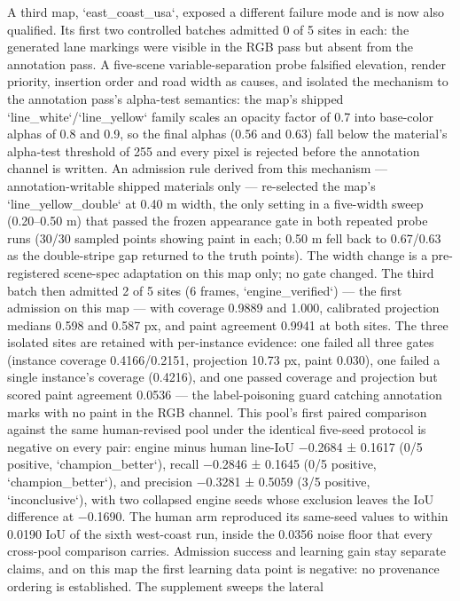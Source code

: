 \documentclass[journal]{IEEEtran}
\begin{document}
A third map, `east_coast_usa`, exposed a different failure mode and is now also qualified. Its first two controlled batches admitted 0 of 5 sites in each: the generated lane markings were visible in the RGB pass but absent from the annotation pass. A five-scene variable-separation probe falsified elevation, render priority, insertion order and road width as causes, and isolated the mechanism to the annotation pass's alpha-test semantics: the map's shipped `line_white`/`line_yellow` family scales an opacity factor of 0.7 into base-color alphas of 0.8 and 0.9, so the final alphas (0.56 and 0.63) fall below the material's alpha-test threshold of 255 and every pixel is rejected before the annotation channel is written. An admission rule derived from this mechanism --- annotation-writable shipped materials only --- re-selected the map's `line_yellow_double` at 0.40 m width, the only setting in a five-width sweep (0.20--0.50 m) that passed the frozen appearance gate in both repeated probe runs (30/30 sampled points showing paint in each; 0.50 m fell back to 0.67/0.63 as the double-stripe gap returned to the truth points). The width change is a pre-registered scene-spec adaptation on this map only; no gate changed. The third batch then admitted 2 of 5 sites (6 frames, `engine_verified`) --- the first admission on this map --- with coverage 0.9889 and 1.000, calibrated projection medians 0.598 and 0.587 px, and paint agreement 0.9941 at both sites. The three isolated sites are retained with per-instance evidence: one failed all three gates (instance coverage 0.4166/0.2151, projection 10.73 px, paint 0.030), one failed a single instance's coverage (0.4216), and one passed coverage and projection but scored paint agreement 0.0536 --- the label-poisoning guard catching annotation marks with no paint in the RGB channel. This pool's first paired comparison against the same human-revised pool under the identical five-seed protocol is negative on every pair: engine minus human line-IoU −0.2684 ± 0.1617 (0/5 positive, `champion_better`), recall −0.2846 ± 0.1645 (0/5 positive, `champion_better`), and precision −0.3281 ± 0.5059 (3/5 positive, `inconclusive`), with two collapsed engine seeds whose exclusion leaves the IoU difference at −0.1690. The human arm reproduced its same-seed values to within 0.0190 IoU of the sixth west-coast run, inside the 0.0356 noise floor that every cross-pool comparison carries. Admission success and learning gain stay separate claims, and on this map the first learning data point is negative: no provenance ordering is established.
The supplement sweeps the lateral
\end{document}
